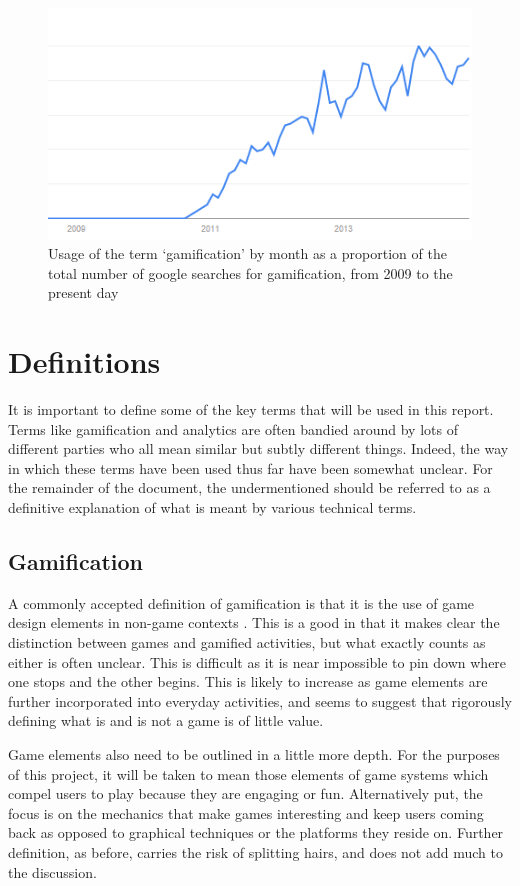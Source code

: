\documentclass{article}
\begin{document}
\begin{figure}
	\includegraphics{../img/usage-graph.png}
	\caption{Usage of the term `gamification' by month as a proportion of the total number of google searches for gamification, from 2009 to the present day \cite{usage}}
	\label{usagegraph}
\end{figure}

\section{Definitions}
It is important to define some of the key terms that will be used in this report. Terms like gamification and analytics are often bandied around by lots of different parties who all mean similar but subtly different things. Indeed, the way in which these terms have been used thus far have been somewhat unclear. For the remainder of the document, the undermentioned should be referred to as a definitive explanation of what is meant by various technical terms.

\subsection{Gamification}
A commonly accepted definition of gamification is that it is the use of game design elements in non-game contexts \cite{deterding2011game}. This is a good in that it makes clear the distinction between games and gamified activities, but what exactly counts as either is often unclear. This is difficult as it is near impossible to pin down where one stops and the other begins. This is likely to increase as game elements are further incorporated into everyday activities, and seems to suggest that rigorously defining what is and is not a game is of little value. 

Game elements also need to be outlined in a little more depth. For the purposes of this project, it will be taken to mean those elements of game systems which compel users to play because they are engaging or fun. Alternatively put, the focus is on the mechanics that make games interesting and keep users coming back as opposed to graphical techniques or the platforms they reside on. Further definition, as before, carries the risk of splitting hairs, and does not add much to the discussion.
\end{document}
